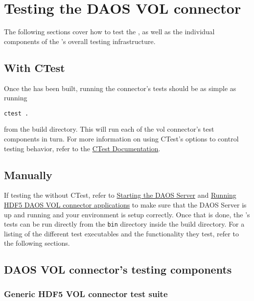 \documentclass[../users_guide.tex]{subfiles}
\begin{document}
\section{Testing the DAOS VOL connector}

The following sections cover how to test the \dvc{}, as well as the individual components of the \dvc's overall testing infrastructure.

\subsection{With CTest}

Once the \dvc{} has been built, running the \gls{connector}'s tests should be as simple as running

\begin{verbatim}
ctest .
\end{verbatim}

from the build directory. This will run each of the \acrshort{vol} \gls{connector}'s test components in turn. For more information on using CTest's options to control testing behavior, refer to the \href{https://cmake.org/cmake/help/v3.15/manual/ctest.1.html}{CTest Documentation}.

\subsection{Manually}

If testing the \dvc{} without CTest, refer to \hyperref[sec:daos_serv_start]{Starting the DAOS Server} and \hyperref[running_daos_vol_apps]{Running HDF5 DAOS VOL connector applications} to make sure that the DAOS Server is up and running and your environment is setup correctly. Once that is done, the \dvc's tests can be run directly from the \texttt{bin} directory inside the build directory. For a listing of the different test executables and the functionality they test, refer to the following sections.


\subsection{DAOS VOL connector's testing components}

\subsubsection{Generic HDF5 VOL connector test suite}
\end{document}
